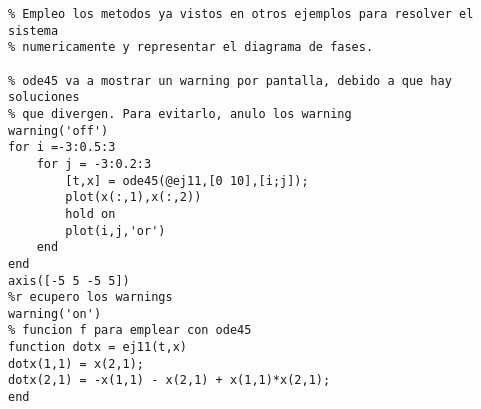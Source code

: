 \begin{lstlisting}
% Empleo los metodos ya vistos en otros ejemplos para resolver el sistema
% numericamente y representar el diagrama de fases.

% ode45 va a mostrar un warning por pantalla, debido a que hay soluciones
% que divergen. Para evitarlo, anulo los warning
warning('off')
for i =-3:0.5:3
    for j = -3:0.2:3
        [t,x] = ode45(@ej11,[0 10],[i;j]);
        plot(x(:,1),x(:,2))
        hold on
        plot(i,j,'or')
    end
end
axis([-5 5 -5 5])
%r ecupero los warnings
warning('on')
% funcion f para emplear con ode45
function dotx = ej11(t,x)
dotx(1,1) = x(2,1);
dotx(2,1) = -x(1,1) - x(2,1) + x(1,1)*x(2,1);
end
\end{lstlisting}
